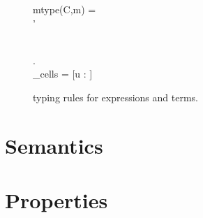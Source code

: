 \begin{figure}[t]
    \vspace{0.5em}

    
    \vspace{0.5em}

    { \andalso mtype(C,m) = \sigma \to \tau \\
     \andalso \sigma' \stof \sigma }
    {}
    
    \vspace{0.5em}

    { \andalso {}}
    {}
    
    \vspace{0.5em}

    { \andalso {} \\
    \forall {} \in {}. \; \\
    \Gamma_{cells} = [u \mapsto \CellType :  \in {}]\\
    }
    {  }
  \caption{\RACL{} typing rules for expressions and terms.}
  \label{fig:expr_typing}
\end{figure}



\section{Semantics}
\label{sec:semantics}


\section{Properties}
\label{sec:properties}




